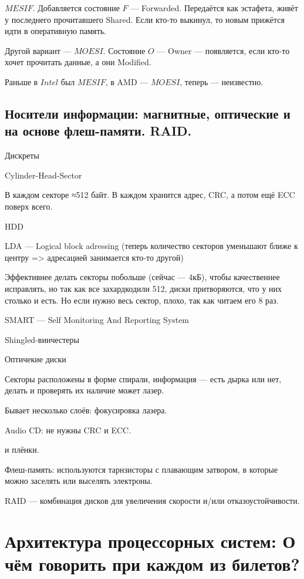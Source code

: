 \documentclass[12pt, a4paper]{article}
\begin{document}
$MESIF$. Добавляется состояние $F$ — Forwarded. Передаётся как эстафета, живёт у последнего прочитавшего Shared.
Если кто-то выкинул, то новым прижётся идти в оперативную память.


Другой вариант — $MOESI$. Состояние $O$ — Owner — появляется, если кто-то хочет прочитать данные, а они Modified.

Раньше в $Intel$ был $MESIF$, в AMD — $MOESI$, теперь — неизвестно.

\subsection{Носители информации: магнитные, оптические и на основе флеш-памяти. RAID.}

Дискреты

Cylinder-Head-Sector

В каждом секторе ≈512 байт. В каждом хранится адрес, CRC, а потом ещё ECC поверх всего.

HDD

LDA — Logical block adressing (теперь количество секторов уменьшают ближе к центру => адресацией занимается кто-то другой)

Эффективнее делать секторы побольше (сейчас — 4кБ), чтобы качественнее исправлять, но так как все захардкодили 512, 
диски притворяются, что у них столько и есть. Но если нужно весь сектор, плохо, так как читаем его 8 раз.

SMART — Self Monitoring And Reporting System

Shingled-винчестеры

Оптичекие диски

Секторы расположены в форме спирали, информация — есть дырка или нет, делать и проверять их наличие может лазер.

Бывает несколько слоёв: фокусировка лазера.

Audio CD: не нужны CRC и ECC.




и плёнки.

Флеш-память: используются тарнзисторы с плавающим затвором, в которые можно заселять или выселять электроны.

RAID — комбинация дисков для увеличения скорости и/или отказоустойчивости.


\section{Архитектура процессорных систем: О чём говорить при каждом из билетов?}
\end{document}
